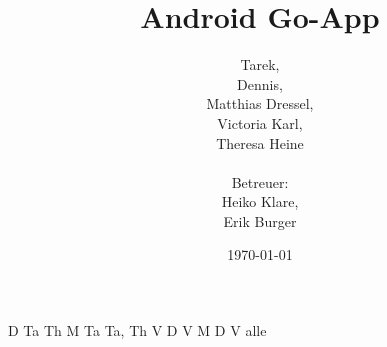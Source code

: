 \documentclass[parskip=full]{scrartcl}
\begin{document}
\title{Android Go-App}
\author{Tarek, \\Dennis, \\Matthias Dressel, \\Victoria Karl, \\Theresa Heine\\
	\\Betreuer: \\Heiko Klare, \\ Erik Burger\\}
\date{\today}
\maketitle
\newpage
\tableofcontents
\newpage

 D
 Ta
 Th
 M
 Ta
 Ta, Th
 V
 D
 V
 M
 D
 V
 alle
\end{document}
